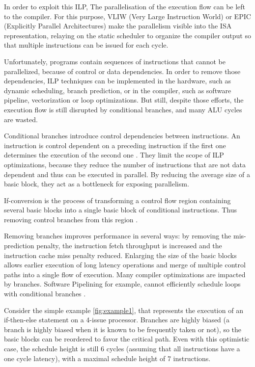 In order to exploit this ILP, The parallelisation of the execution flow \cite{Rau:2003:IP:1074100.1074489} can be left to the compiler. For this purpose, VLIW (Very Large Instruction World) or EPIC (Explicitly Parallel Architectures) make the parallelism visible into the ISA representation, relaying on the static scheduler to organize the compiler output so that multiple instructions can be issued for each cycle. 

Unfortunately, programs contain sequences of instructions that cannot be parallelized, because of control or data dependencies. In order to remove those dependencies, ILP techniques can be implemented in the hardware, such as dynamic scheduling, branch prediction, or in the compiler, such as software pipeline, vectorization or loop optimizations. But still, despite those efforts, the execution flow is still disrupted by conditional branches, and many ALU cycles are wasted. 

Conditional branches introduce control dependencies between instructions. An instruction is control dependent on a preceding instruction if the first one determines the execution of the second one \cite{Kennedy:2001:OCM:502981}. They limit the scope of ILP optimizations, because they reduce the number of instructions that are not data dependent and thus can be executed in parallel. By reducing the average size of a basic block, they act as a bottleneck for exposing parallelism.

If-conversion is the process of transforming a control flow region containing several basic blocks into a single basic block of conditional instructions. Thus removing control branches from this region \cite{Schlansker97achievinghigh}.

Removing branches improves performance in several ways: by removing the mis-prediction penalty, the instruction fetch throughput is increased and the instruction cache miss penalty reduced. Enlarging the size of the basic blocks allows earlier execution of long latency operations and merge of multiple control paths into a single flow of execution. Many compiler optimizations are impacted by branches. Software Pipelining for example, cannot efficiently schedule loops with conditional branches \cite{Warter:1992:EMS:144953.145796}.

Consider the simple example \ref{fig:example1}, that represents the execution of an if-then-else statement on a 4-issue processor. Branches are highly biased (a branch is highly biased when it is known to be frequently taken or not), so the basic blocks can be reordered to favor the critical path. Even with this optimistic case, the schedule height is still 6 cycles (assuming that all instructions have a one cycle latency), with a maximal schedule height of 7 instructions. 

